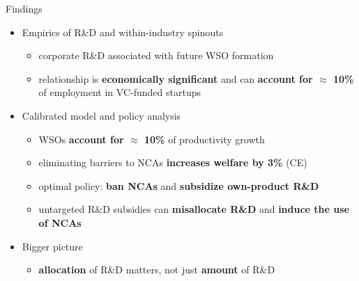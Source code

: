 \documentclass[english,usenames,dvipsnames]{beamer}
\begin{document}
\begin{frame}{Findings}\label{intro_findings}
	\begin{itemize}
		\item<+-> Empirics of R\&D and within-industry spinouts
		\begin{itemize}
			\item corporate R\&D associated with future WSO formation
			\item relationship is \alert{\textbf{economically significant}} and can \alert{\textbf{account for $\approx$ 10\%}} of employment in VC-funded startups   
		\end{itemize}
		\medskip
		\item<+-> Calibrated model and policy analysis
		\begin{itemize}
			\item WSOs \alert{\textbf{account for $\approx$ 10\%}} of productivity growth
			\item eliminating barriers to NCAs \alert{\textbf{increases welfare by 3\%}} (CE)
			\item optimal policy: \alert{\textbf{ban NCAs}} and \alert{\textbf{subsidize own-product R\&D}} 
			\item untargeted R\&D subsidies can \alert{\textbf{misallocate R\&D}} and \alert{\textbf{induce the use of NCAs}}
		\end{itemize}
		\medskip
		\item<+-> Bigger picture
		\begin{itemize}
			\item \alert{\textbf{allocation}} of R\&D matters, not just \alert{\textbf{amount}} of R\&D
		\end{itemize}
	\end{itemize}
\end{frame}
\end{document}
